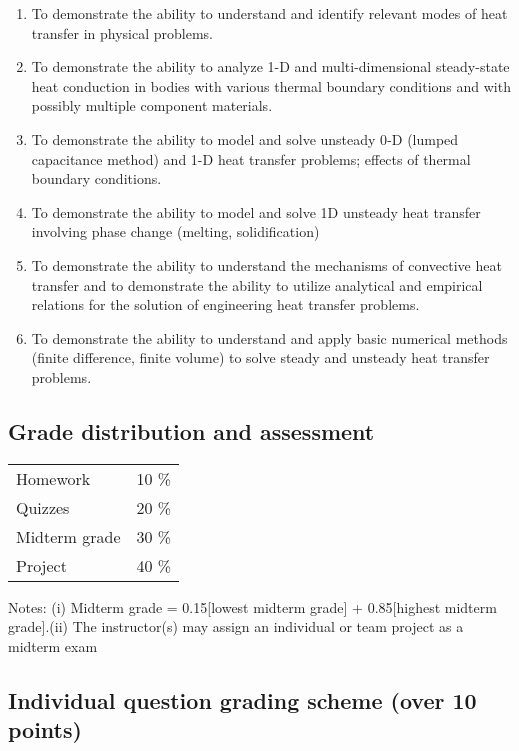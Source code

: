 \documentclass{article}%
\begin{document}
%
\begin{enumerate}[label=\alph*)]%
\item%
To demonstrate the ability to understand and identify relevant modes of heat transfer in physical problems.%
\item%
To demonstrate the ability to analyze 1{-}D and multi{-}dimensional steady{-}state heat conduction in bodies with various thermal boundary conditions and with possibly multiple component materials.%
\item%
To demonstrate the ability to model and solve unsteady 0{-}D (lumped capacitance method) and 1{-}D heat transfer problems; effects of thermal boundary conditions.%
\item%
To demonstrate the ability to model and solve 1D unsteady heat transfer involving phase change (melting, solidification)%
\item%
To demonstrate the ability to understand the mechanisms of convective heat transfer and to demonstrate the ability to utilize analytical and empirical relations for the solution of engineering heat transfer problems.%
\item%
To demonstrate the ability to understand and apply basic numerical methods (finite difference, finite volume) to solve steady and unsteady heat transfer problems.%
\end{enumerate}%
\subsection*{Grade distribution and assessment}%
\label{subsec:Grade distribution and assessment}%

%
\begin{tabular}{|l|c|}%
\hline%
Homework&10 \%\\%
Quizzes&20 \%\\%
Midterm grade&30 \%\\%
Project&40 \%\\%
\hline%
\end{tabular}%
\linebreak%
Notes: (i) Midterm grade = 0.15{[}lowest midterm grade{]} + 0.85{[}highest midterm grade{]}.(ii) The instructor(s) may assign an individual or team project as a midterm exam%
\subsection*{Individual question grading scheme (over 10 points)}%
\label{subsec:Individual question grading scheme (over 10 points)}%
\end{document}

